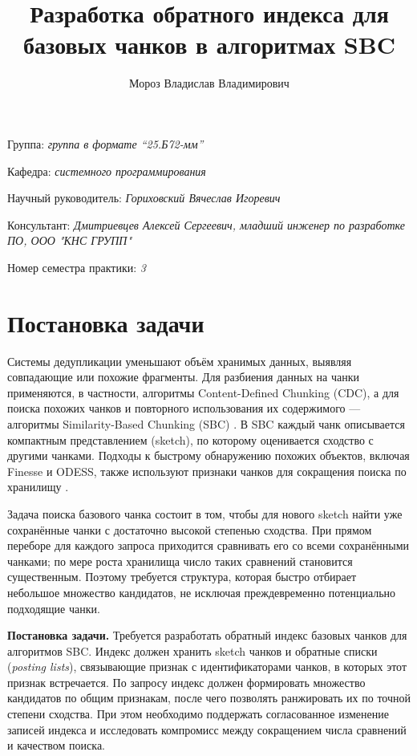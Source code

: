\documentclass[a4paper]{article}
\title{Разработка обратного индекса для базовых чанков в алгоритмах SBC}
\author{Мороз Владислав Владимирович}
\date{}
\begin{document}
\maketitle

\begin{flushright}
    Группа: \emph{группа в формате \enquote{25.Б72-мм}}

    Кафедра: \emph{системного программирования}

    Научный руководитель: \emph{Гориховский Вячеслав Игоревич}

    Консультант: \emph{Дмитриевцев Алексей Сергеевич, младший инженер по разработке ПО, ООО "КНС ГРУПП"}
    
    Номер семестра практики: \emph{3}
\end{flushright} 


\section{Постановка задачи}

Системы дедупликации уменьшают объём хранимых данных, выявляя совпадающие или похожие фрагменты. Для разбиения данных на чанки применяются, в частности, алгоритмы Content-Defined Chunking (CDC), а для поиска похожих чанков и повторного использования их содержимого --- алгоритмы Similarity-Based Chunking (SBC) \cite{xia2020,aronovich2009}. В SBC каждый чанк описывается компактным представлением (sketch), по которому оценивается сходство с другими чанками. Подходы к быстрому обнаружению похожих объектов, включая Finesse и ODESS, также используют признаки чанков для сокращения поиска по хранилищу \cite{zhang2019,zou2021}.

Задача поиска базового чанка состоит в том, чтобы для нового sketch найти уже сохранённые чанки с достаточно высокой степенью сходства. При прямом переборе для каждого запроса приходится сравнивать его со всеми сохранёнными чанками; по мере роста хранилища число таких сравнений становится существенным. Поэтому требуется структура, которая быстро отбирает небольшое множество кандидатов, не исключая преждевременно потенциально подходящие чанки.

\textbf{Постановка задачи.} Требуется разработать обратный индекс базовых чанков для алгоритмов SBC. Индекс должен хранить sketch чанков и обратные списки (\emph{posting lists}), связывающие признак с идентификаторами чанков, в которых этот признак встречается. По запросу индекс должен формировать множество кандидатов по общим признакам, после чего позволять ранжировать их по точной степени сходства. При этом необходимо поддержать согласованное изменение записей индекса и исследовать компромисс между сокращением числа сравнений и качеством поиска.
\end{document}
